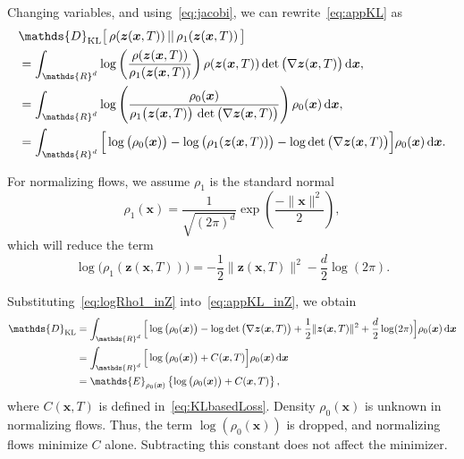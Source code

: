 \documentclass[letterpaper]{article}
\newcommand{\bfx}{\boldsymbol{x}}
\newcommand{\bfz}{\boldsymbol{z}}
\def\du{\ensuremath{\mathrm{d}}}
\newcommand{\R}{\ensuremath{\mathds{R}}}
\newcommand{\E}{\ensuremath{\mathds{E}}}
\newcommand{\D}{\ensuremath{\mathds{D}}}
\begin{document}
	Changing variables, and using~\eqref{eq:jacobi}, we can rewrite~\eqref{eq:appKL} as
	\begin{equation}
	  \label{eq:appKL_inZ}
	  \begin{split}
	  &\D_{\rm KL} \big[ \, \rho(\bfz(\bfx,T)) \, || \, \rho_1(\bfz(\bfx,T)) \, \big] 
	  \\
	  &= \int_{\R^d} \log\left(\frac{\rho(\bfz(\bfx,T))}{\rho_1(\bfz(\bfx,T))}\right) \rho(\bfz(\bfx,T)) \det\big(\nabla \bfz(\bfx, T)\big) \, \du \bfx,
	  \\
	  &= \int_{\R^d} \log\left(\frac{\rho_0(\bfx)}{\rho_1 \big(\bfz(\bfx,T)\big) \, \det \big(\nabla \bfz(\bfx,T)\big)}\right) \rho_0(\bfx)
	  \, \du \bfx,
	  \\
	  &= \int_{\R^d} \Big[ \log\big(\rho_0(\bfx)\big) - \log\big(\rho_1(\bfz(\bfx,T))\big) - \log\det\big(\nabla \bfz(\bfx,T)\big) \Big] \rho_0(\bfx) \, \du \bfx.
	  \end{split}
	\end{equation}
	 
	
	For normalizing flows, we assume $\rho_1$ is the standard normal
	\begin{equation}
	  \rho_1(\bfx) = \dfrac{1}{\sqrt{(2\pi)^d}}  \exp{\left(\frac{-\| \bfx \|^2}{2} \right)},
	\end{equation}	
	which will reduce the term
	\begin{equation}
	  \label{eq:logRho1_inZ}
	  \log\big(\rho_1(\bfz(\bfx,T))\big) = - \frac{1}{2} \| \bfz(\bfx,T) \|^2 - \frac{d}{2}\log(2\pi).
	\end{equation}
	
	Substituting~\eqref{eq:logRho1_inZ} into~\eqref{eq:appKL_inZ}, we obtain 
	\begin{equation}
	  \begin{split}
	    \D_{\rm KL} &= \int_{\R^d} \Big[\log\big(\rho_0(\bfx)\big) - \log\det \big(\nabla \bfz(\bfx, T)\big) + \- \frac{1}{2} \| \bfz(\bfx,T) \|^2 + \frac{d}{2}\log(2\pi) \Big] \rho_0(\bfx) \, \du\bfx
	    \\
	    &= \int_{\R^d} \Big[\log\big(\rho_0(\bfx)\big) + C(\bfx,T)\Big] \rho_0(\bfx) \, \du \bfx
	    \\
	    &= \E_{\rho_0(\bfx)}  \left\{ \log\big(\rho_0(\bfx)\big) + C(\bfx,T) \right\},
	  \end{split}
	\end{equation}
	where $C(\bfx,T)$ is defined in~\eqref{eq:KLbasedLoss}.
	Density $\rho_0(\bfx)$ is unknown in normalizing flows. Thus, the term $\log(\rho_0(\bfx))$ is dropped, and normalizing flows minimize $C$ alone. Subtracting this constant does not affect the minimizer. 
\end{document}
